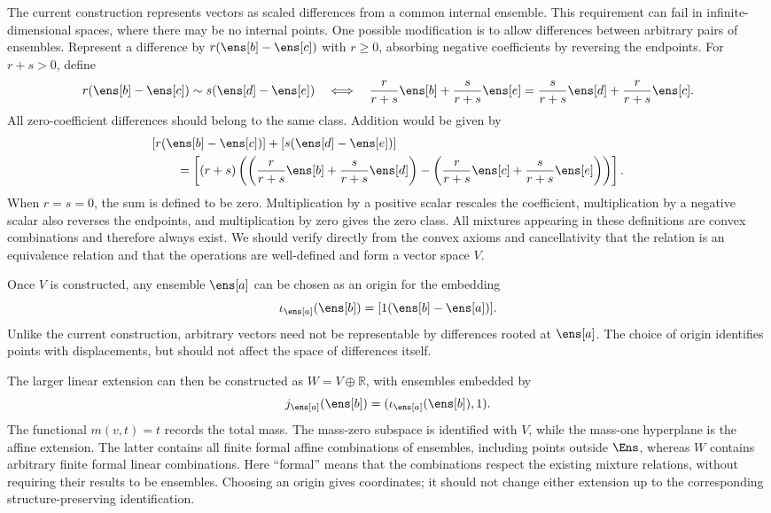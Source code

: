 The current construction represents vectors as scaled differences from a common internal ensemble. This requirement can fail in infinite-dimensional spaces, where there may be no internal points. One possible modification is to allow differences between arbitrary pairs of ensembles. Represent a difference by $r(\ens[b]-\ens[c])$ with $r\geq0$, absorbing negative coefficients by reversing the endpoints. For $r+s>0$, define
\[
r(\ens[b]-\ens[c])\sim s(\ens[d]-\ens[e])
\quad\Longleftrightarrow\quad
\frac{r}{r+s}\ens[b]+\frac{s}{r+s}\ens[e]
=
\frac{s}{r+s}\ens[d]+\frac{r}{r+s}\ens[c].
\]
All zero-coefficient differences should belong to the same class. Addition would be given by
\[
\begin{aligned}
	&[r(\ens[b]-\ens[c])]+[s(\ens[d]-\ens[e])]\\
	&\qquad=
	\left[(r+s)\left(
	\left(\frac{r}{r+s}\ens[b]+\frac{s}{r+s}\ens[d]\right)
	-
	\left(\frac{r}{r+s}\ens[c]+\frac{s}{r+s}\ens[e]\right)
	\right)\right].
\end{aligned}
\]
When $r=s=0$, the sum is defined to be zero. Multiplication by a positive scalar rescales the coefficient, multiplication by a negative scalar also reverses the endpoints, and multiplication by zero gives the zero class. All mixtures appearing in these definitions are convex combinations and therefore always exist. We should verify directly from the convex axioms and cancellativity that the relation is an equivalence relation and that the operations are well-defined and form a vector space $V$.

Once $V$ is constructed, any ensemble $\ens[a]$ can be chosen as an origin for the embedding
\[
\iota_{\ens[a]}(\ens[b])=[1(\ens[b]-\ens[a])].
\]
Unlike the current construction, arbitrary vectors need not be representable by differences rooted at $\ens[a]$. The choice of origin identifies points with displacements, but should not affect the space of differences itself.

The larger linear extension can then be constructed as $W=V\oplus\mathbb{R}$, with ensembles embedded by
\[
j_{\ens[a]}(\ens[b])=(\iota_{\ens[a]}(\ens[b]),1).
\]
The functional $m(v,t)=t$ records the total mass. The mass-zero subspace is identified with $V$, while the mass-one hyperplane is the affine extension. The latter contains all finite formal affine combinations of ensembles, including points outside $\Ens$, whereas $W$ contains arbitrary finite formal linear combinations. Here ``formal'' means that the combinations respect the existing mixture relations, without requiring their results to be ensembles. Choosing an origin gives coordinates; it should not change either extension up to the corresponding structure-preserving identification.

